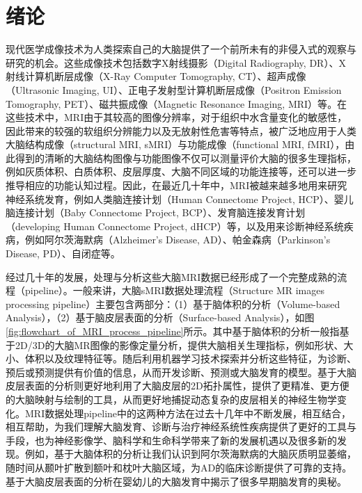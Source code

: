 \chapter{绪论}\label{sec:绪论}

现代医学成像技术为人类探索自己的大脑提供了一个前所未有的非侵入式的观察与研究的机会。这些成像技术包括数字X射线摄影（Digital Radiography, DR）、X 射线计算机断层成像（X-Ray Computer Tomography, CT）、超声成像（Ultrasonic Imaging, UI）、正电子发射型计算机断层成像（Positron Emission Tomography, PET）、磁共振成像（Magnetic Resonance Imaging, MRI）等\cite{picano2004sustainability}。在这些技术中，MRI由于其较高的图像分辨率，对于组织中水含量变化的敏感性，因此带来的较强的软组织分辨能力以及无放射性危害等特点，被广泛地应用于人类大脑结构成像（structural MRI, sMRI）与功能成像（functional MRI, fMRI）\cite{giedd1999brain}，由此得到的清晰的大脑结构图像与功能图像不仅可以测量评价大脑的很多生理指标，例如灰质体积、白质体积、皮层厚度、大脑不同区域的功能连接等，还可以进一步推导相应的功能认知过程\cite{poldrack2006can}。因此，在最近几十年中，MRI被越来越多地用来研究神经系统发育，例如人类脑连接计划（Human Connectome Project, HCP）\cite{van2013wu}、婴儿脑连接计划（Baby Connectome Project, BCP）\cite{howell2019unc}、发育脑连接发育计划（developing  Human Connectome  Project,  dHCP）\cite{makropoulos2018developing}等，以及用来诊断神经系统疾病，例如阿尔茨海默病（Alzheimer's Disease, AD）\cite{mueller2005alzheimer}、帕金森病（Parkinson's Disease, PD）\cite{brooks2003assessment}、自闭症\cite{anagnostou2011review}等。

经过几十年的发展，处理与分析这些大脑MRI数据已经形成了一个完整成熟的流程（pipeline）\cite{glasser2013minimal,li2019computational}。一般来讲，大脑sMRI数据处理流程（Structure MR images processing pipeline）主要包含两部分：（1）基于脑体积的分析（Volume-based Analysis），（2）基于脑皮层表面的分析（Surface-based Analysis），如图\ref{fig:flowchart_of_MRI_process_pipeline}所示。其中基于脑体积的分析一般指基于2D/3D的大脑MR图像的影像定量分析，提供大脑相关生理指标，例如形状、大小、体积以及纹理特征等。随后利用机器学习技术探索并分析这些特征，为诊断、预后或预测提供有价值的信息，从而开发诊断、预测或大脑发育的模型。基于大脑皮层表面的分析则更好地利用了大脑皮层的2D拓扑属性，提供了更精准、更方便的大脑映射与绘制的工具，从而更好地捕捉动态复杂的皮层相关的神经生物学变化。MRI数据处理pipeline中的这两种方法在过去十几年中不断发展，相互结合，相互帮助，为我们理解大脑发育、诊断与治疗神经系统性疾病提供了更好的工具与手段，也为神经影像学、脑科学和生命科学带来了新的发展机遇以及很多新的发现。例如，基于大脑体积的分析让我们认识到阿尔茨海默病的大脑灰质明显萎缩，随时间从颞叶扩散到额叶和枕叶大脑区域\cite{thompson2003dynamics}，为AD的临床诊断提供了可靠的支持。基于大脑皮层表面的分析在婴幼儿的大脑发育中揭示了很多早期脑发育的奥秘\cite{li2019computational,wang2019developmental,duan2019exploring}。

